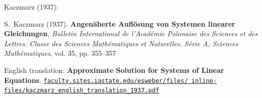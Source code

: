 \documentclass[usepdftitle=false,usenames,dvipsnames]{beamer}
\begin{document}
\begin{frame}{Kaczmarz (1937):}

\begin{thebibliography}{1}
  {\footnotesize S.~Kaczmarz (1937). \textbf{Angenäherte Auflösung von Systemen linearer Gleichungen}, \emph{Bulletin International de l'Académie Polonaise des Sciences et des Lettres. Classe des Sciences Mathématiques et Naturelles. Série A, Sciences Mathématiques}, vol. 35, pp. \alert{355--357}}

  {\footnotesize English translation: \textbf{Approximate Solution for Systems of Linear Equations}. \href{https://faculty.sites.iastate.edu/esweber/files/inline-files/kaczmarz_english_translation_1937.pdf}{\texttt{faculty.sites.iastate.edu/esweber/files/ inline-files/kaczmarz\_english\_translation\_1937.pdf}}}
\end{thebibliography}
\end{frame}
\end{document}

